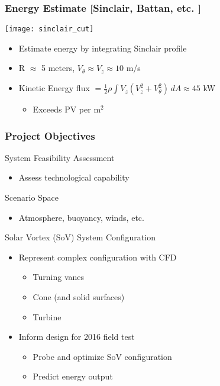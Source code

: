 \documentclass[mathserif]{beamer}
\begin{document}
%
%
%
\begin{frame}
\frametitle{Energy Estimate [Sinclair, Battan, etc. ]}

   \begin{center}
    \texttt{[image: sinclair\_cut]}
   \end{center}

\begin{itemize}
  \item Estimate energy by integrating Sinclair profile 
  \item R $\approx$ 5 meters, $V_{\theta} \approx V_{z} \approx 10$ m/s 
  \item Kinetic Energy flux $ = \frac{1}{2}\rho \int V_z (V_z^2 + V_{\theta}^2)
	\, dA \approx 45$ kW
 \begin{itemize}
  \item Exceeds PV per $\text{m}^2$
 \end{itemize}
\end{itemize}

\end{frame}

\begin{frame}
\frametitle{Project Objectives}

 \begin{block}{System Feasibility Assessment}
  \begin{itemize}
   \item Assess technological capability
  \end{itemize}
 \end{block}


 \begin{block}{Scenario Space}
  \begin{itemize}
   \item Atmosphere, buoyancy, winds, etc. 
  \end{itemize}
  \end{block}

 \begin{block}{Solar Vortex (SoV) System Configuration}
 \begin{itemize}
  \item Represent complex configuration with CFD
	\begin{itemize}
	 \item Turning vanes
	 \item Cone (and solid surfaces)
	 \item Turbine
	\end{itemize}
  \item Inform design for 2016 field test
	\begin{itemize}
	 \item Probe and optimize SoV configuration
	 \item Predict energy output
	\end{itemize}
 \end{itemize}
 \end{block}

\end{frame}
\end{document}
